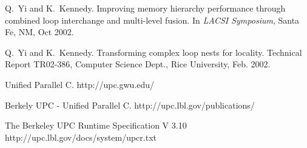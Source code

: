 \begin{thebibliography}{WW}
Q.~Yi and K.~Kennedy.
\newblock Improving memory hierarchy performance through combined loop
  interchange and multi-level fusion.
\newblock In {\em LACSI Symposium}, Santa Fe, NM, Oct 2002.

Q.~Yi and K.~Kennedy.
\newblock Transforming complex loop nests for locality.
\newblock Technical Report TR02-386, Computer Science Dept., Rice University,
  Feb. 2002.

\newblock Unified Parallel C.
\newblock http://upc.gwu.edu/

\newblock Berkely UPC - Unified Parallel C.
\newblock http://upc.lbl.gov/publications/

\newblock The Berkeley UPC Runtime Specification V 3.10
\newblock http://upc.lbl.gov/docs/system/upcr.txt


\end{thebibliography}





